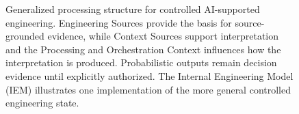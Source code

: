 \begin{figure}[t]

\caption{Generalized processing structure for controlled AI-supported engineering.
Engineering Sources provide the basis for source-grounded evidence, while Context Sources
support interpretation and the Processing and Orchestration Context influences how the
interpretation is produced. Probabilistic outputs remain decision evidence until explicitly
authorized. The Internal Engineering Model (IEM) illustrates one implementation of the more
general controlled engineering state.}
\label{fig:controlled_ai_workflow}
\end{figure}

